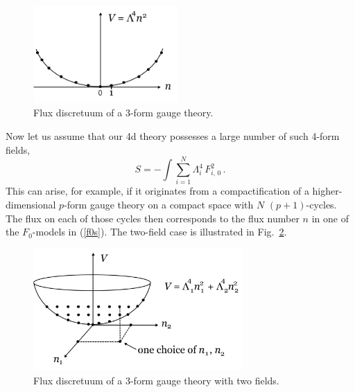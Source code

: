 \documentclass[12pt]{article}
\newcommand{\be}{\begin{equation}}
\newcommand{\ee}{\end{equation}}
\numberwithin{equation}{section}
\begin{document}
\begin{figure}[ht]
\begin{center} 
\includegraphics[width=5.5cm]{bp.png}
\caption{Flux discretuum of a 3-form gauge theory.}
\label{bp} 
\end{center}
\end{figure}

Now let us assume that our 4d theory possesses a large number of such 4-form fields,
\be
S= -\int \sum_{i=1}^N\Lambda_i^4\, F_{i,\,0}^2\,.\label{f0s}
\ee
This can arise, for example, if it originates from a compactification of a higher-dimensional $p$-form gauge theory on a compact space with $N$ $(p\!+\!1)$-cycles. The flux on each of those cycles then corresponds to the flux number $n$ in one of the $F_0$-models in (\ref{f0s}). The two-field case is illustrated in Fig.~\ref{bp2}.

\begin{figure}[ht]
\begin{center} 
\includegraphics[width=8cm]{bp2.png}
\caption{Flux discretuum of a 3-form gauge theory with two fields.}
\label{bp2} 
\end{center}
\end{figure}
\end{document}
